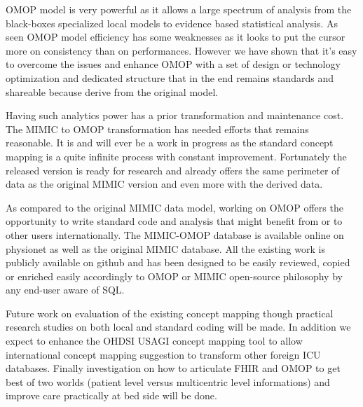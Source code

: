 OMOP model is very powerful as it allows a large spectrum of analysis from the
black-boxes specialized local models to evidence based statistical analysis.
As seen OMOP model efficiency has some weaknesses as it looks to put the cursor
more on consistency than on performances. However we have shown that it's easy
to overcome the issues and enhance OMOP with a set of design or technology
optimization and dedicated structure that in the end remains standards and
shareable because derive from the original model.

Having such analytics power has a prior transformation and maintenance cost.
The MIMIC to OMOP transformation has needed efforts that remains reasonable. It
is and will ever be a work in progress as the standard concept mapping is a
quite infinite process with constant improvement. Fortunately the released
version is ready for research and already offers the same perimeter of data as
the original MIMIC version and even more with the derived data.

As compared to the original MIMIC data model, working on OMOP offers the
opportunity to write standard code and analysis that might benefit from or to
other users internationally. The MIMIC-OMOP database is available online on
physionet as well as the original MIMIC database. All the existing work is
publicly available on github \cite{mimic-omop-github} and has been designed to
be easily reviewed, copied or enriched easily accordingly to OMOP or MIMIC
open-source philosophy by any end-user aware of SQL.

Future work on evaluation of the existing concept mapping though practical
research studies on both local and standard coding will be made. In addition we
expect to enhance the OHDSI USAGI concept mapping tool to allow international
concept mapping suggestion to transform other foreign ICU databases. Finally
investigation on how to articulate FHIR and OMOP to get best of two worlds
(patient level versus multicentric level informations) and improve care
practically at bed side will be done.
